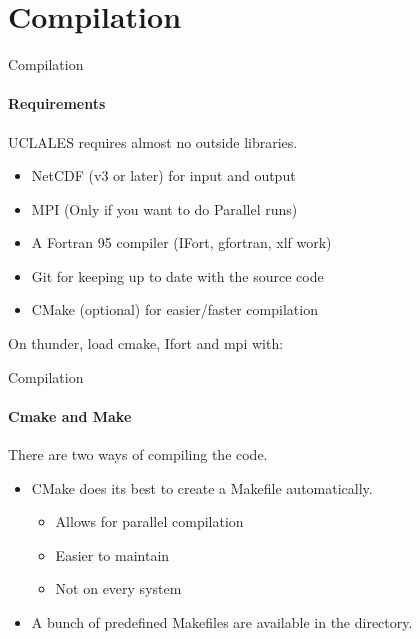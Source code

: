 \section{Compilation}
\begin{frame}[<+->]{Compilation}
\framesubtitle{Requirements}
UCLALES requires almost no outside libraries.
 \begin{itemize}
  \item NetCDF (v3 or later) for input and output 
  \item MPI (Only if you want to do Parallel runs)
  \item A Fortran 95 compiler (IFort, gfortran, xlf work)
  \item Git for keeping up to date with the source code
  \item CMake (optional) for easier/faster compilation
 \end{itemize}
On thunder, load cmake, Ifort and mpi with:\\
\end{frame}
\begin{frame}[<+->]{Compilation}
\framesubtitle{Cmake and Make}
There are two ways of compiling the code.
\begin{itemize}
 \item CMake does its best to create a Makefile automatically. 
\begin{itemize}
 \item Allows for parallel compilation
 \item Easier to maintain
 \item Not on every system
\end{itemize}
 \item A bunch of predefined Makefiles are available in the  directory.
\end{itemize}
\end{frame}

